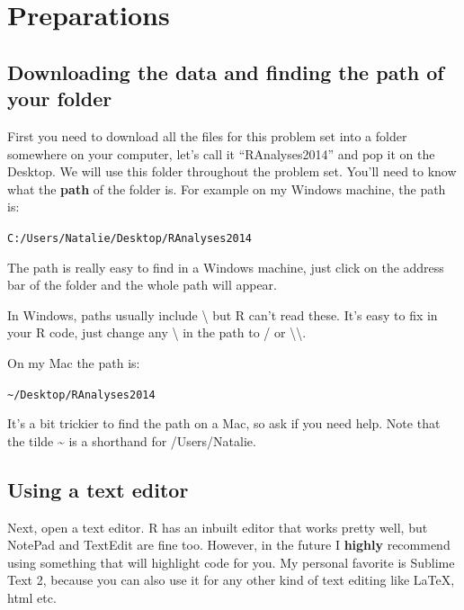 \documentclass[12pt]{article}
\begin{document}
\newpage{}
\section{Preparations}

\subsection{Downloading the data and finding the path of your folder}

First you need to download all the files for this problem set into a
folder somewhere on your computer, let's call it ``RAnalyses2014'' and
pop it on the Desktop. We will use this folder throughout the problem
set. You'll need to know what the \textbf{path} of the folder is. For
example on my Windows machine, the path is:

\begin{snugshade}
\texttt{C:/Users/Natalie/Desktop/RAnalyses2014}
\end{snugshade}

The path is really easy to find in a Windows machine, just click on the
address bar of the folder and the whole path will appear.

\begin{framed}
In Windows, paths usually include \textbackslash{} but R
can't read these. It's easy to fix in your R code, just change any \textbackslash{} in
the path to / or \textbackslash{}\textbackslash{}.
\end{framed}

On my Mac the path is:

\begin{snugshade}
\texttt{\textasciitilde{}/Desktop/RAnalyses2014}
\end{snugshade}

It's a bit trickier to find the path on a Mac, so ask if you need help. Note that the tilde
\textasciitilde{} is a shorthand for /Users/Natalie. 

\subsection{Using a text editor}

Next, open a text editor. R has an inbuilt editor that works pretty
well, but NotePad and TextEdit are fine too. However, in the future I
\textbf{highly} recommend using something that will highlight code for
you. My personal favorite is Sublime Text 2, because you can also use
it for any other kind of text editing like LaTeX, html etc.
\end{document}
